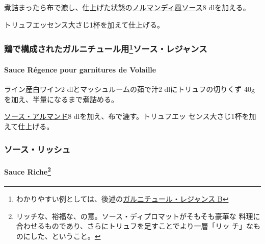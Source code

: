 \begin{recette}
煮詰まったら布で漉し、仕上げた状態の\protect\hyperlink{sauce-normande}{ノルマンディ風ソース}8
dlを加える。

トリュフエッセンス大さじ1杯を加えて仕上げる。

\maeaki

\hypertarget{ux9d8fux3067ux69cbux6210ux3055ux308cux305fux30acux30ebux30cbux30c1ux30e5ux30fcux30ebux7528120ux30bdux30fcux30b9ux30ecux30b8ux30e3ux30f3ux30b9}{%
\subsubsection[鶏で構成されたガルニチュール用ソース・レジャンス]{\texorpdfstring{鶏で構成されたガルニチュール用\footnote{わかりやすい例としては、後述の\protect\hyperlink{garniture-regence}{ガルニチュール・レジャンス
  B}}ソース・レジャンス}{鶏で構成されたガルニチュール用ソース・レジャンス}}\label{ux9d8fux3067ux69cbux6210ux3055ux308cux305fux30acux30ebux30cbux30c1ux30e5ux30fcux30ebux7528120ux30bdux30fcux30b9ux30ecux30b8ux30e3ux30f3ux30b9}}

\hypertarget{sauce-ruxe9gence-pour-garnitures-de-volaille}{%
\paragraph{Sauce Régence pour garnitures de
Volaille}\label{sauce-ruxe9gence-pour-garnitures-de-volaille}}


ライン産白ワイン2 dlとマッシュルームの茹で汁2 dlにトリュフの切りくず
40gを加え、半量になるまで煮詰める。

\protect\hyperlink{sauce-allemande}{ソース・アルマンド}8
dlを加え、布で漉す。トリュフエッ センス大さじ1杯を加えて仕上げる。

\hypertarget{ux30bdux30fcux30b9ux30eaux30c3ux30b7ux30e5}{%
\subsubsection{ソース・リッシュ}\label{ux30bdux30fcux30b9ux30eaux30c3ux30b7ux30e5}}

\hypertarget{sauce-riche121}{%
\paragraph[Sauce Riche]{\texorpdfstring{Sauce Riche\footnote{リッチな、裕福な、の意。ソース・ディプロマットがそもそも豪華な
  料理に合わせるものであり、さらにトリュフを足すことでより一層「リッ
  チ」なものにした、ということ。}}{Sauce Riche}}\label{sauce-riche121}}


\end{recette}
